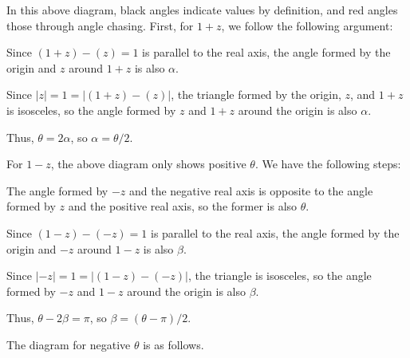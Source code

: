 \documentclass[12pt]{article}
\begin{document}
\begin{answer}
\begin{center}
        \end{center}
        In this above diagram, black angles indicate values
        by definition, and red angles those through angle chasing.
        First, for $1+z$, we follow the following argument:
        \begin{compactenum}[(i)]
        \item Since $(1+z)-(z)=1$ is parallel to the real axis,
            the angle formed by the origin and $z$ around $1+z$ is also $\alpha$.
        \item Since $|z|=1=|(1+z)-(z)|$, the triangle formed by
            the origin, $z$, and $1+z$ is isosceles, so the
            angle formed by $z$ and $1+z$ around the origin is also $\alpha$.
        \item Thus, $\theta = 2\alpha$, so $\alpha = \theta/2$.
        \end{compactenum}
        For $1-z$, the above diagram only shows positive $\theta$. We have the following steps:
        \begin{compactenum}[(i)]
        \item The angle formed by $-z$ and the negative real axis is
            opposite to the angle formed by $z$ and the positive real axis,
            so the former is also $\theta$.
        \item Since $(1-z)-(-z)=1$ is parallel to the real axis,
            the angle formed by the origin and $-z$ around $1-z$ is also $\beta$.
        \item Since $|-z|=1=|(1-z)-(-z)|$, the triangle is isosceles,
            so the angle formed by $-z$ and $1-z$ around the origin is also $\beta$.
        \item Thus, $\theta - 2\beta = \pi$, so $\beta = (\theta-\pi)/2$.
        \end{compactenum}
        The diagram for negative $\theta$ is as follows.
        \begin{center}
\end{center}
\end{answer}
\end{document}
